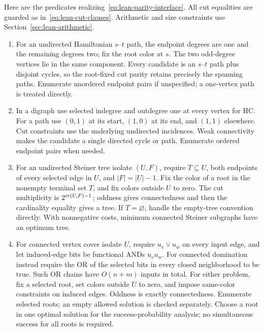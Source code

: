 Here are the predicates realizing~\eqref{eq:lean-parity-interface}.
All cut equalities are guarded as in~\eqref{eq:lean-cut-clauses}.
Arithmetic and size constraints use Section~\ref{sec:lean-arithmetic}.
\begin{enumerate}
\item For an undirected Hamiltonian $s$--$t$ path, the endpoint
degrees are one and the remaining degrees two; fix the root color
at $s$. The two odd-degree vertices lie in the same component.
Every candidate is an $s$--$t$ path plus disjoint cycles, so the
root-fixed cut parity retains precisely the spanning paths.
Enumerate unordered endpoint pairs if unspecified; a one-vertex
path is treated directly.

\item In a digraph use selected indegree and outdegree one at every
vertex for HC. For a path use $(0,1)$ at its start, $(1,0)$ at
its end, and $(1,1)$ elsewhere. Cut constraints use the underlying
undirected incidences. Weak connectivity makes the candidate a single
directed cycle or path. Enumerate ordered endpoint pairs when needed.

\item For an undirected Steiner tree isolate $(U,F)$, require
$T\subseteq U$, both endpoints of every selected edge in $U$,
and $|F|=|U|-1$. Fix the color of a root in the nonempty terminal
set $T$, and fix colors outside $U$ to zero. The cut multiplicity is
$2^{\operatorname{cc}(U,F)-1}$; oddness gives connectedness and then the cardinality
equality gives a tree. If $T=\varnothing$, handle the empty-tree
convention directly. With nonnegative costs, minimum connected
Steiner subgraphs have an optimum tree.

\item For connected vertex cover isolate $U$, require
$u_v\vee u_w$ on every input edge, and let induced-edge bits be
functional ANDs $u_vu_w$. For connected domination instead require
the OR of the selected bits in every closed neighborhood to be true.
Such OR chains have $O(n+m)$ inputs in total. For either problem,
fix a selected root, set colors outside $U$ to zero, and impose
same-color constraints on induced edges. Oddness is exactly
connectedness. Enumerate selected roots; an empty allowed solution
is checked separately. Choose a root in one optimal solution for
the success-probability analysis; no simultaneous success for all
roots is required.


\end{enumerate}
